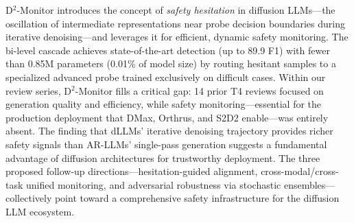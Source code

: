 \documentclass[11pt,a4paper]{article}
\begin{document}
D$^2$-Monitor introduces the concept of \emph{safety hesitation} in diffusion LLMs---the oscillation of intermediate representations near probe decision boundaries during iterative denoising---and leverages it for efficient, dynamic safety monitoring. The bi-level cascade achieves state-of-the-art detection (up to 89.9 F1) with fewer than 0.85M parameters (0.01\% of model size) by routing hesitant samples to a specialized advanced probe trained exclusively on difficult cases. Within our review series, D$^2$-Monitor fills a critical gap: 14 prior T4 reviews focused on generation quality and efficiency, while safety monitoring---essential for the production deployment that DMax, Orthrus, and S2D2 enable---was entirely absent. The finding that dLLMs' iterative denoising trajectory provides richer safety signals than AR-LLMs' single-pass generation suggests a fundamental advantage of diffusion architectures for trustworthy deployment. The three proposed follow-up directions---hesitation-guided alignment, cross-modal/cross-task unified monitoring, and adversarial robustness via stochastic ensembles---collectively point toward a comprehensive safety infrastructure for the diffusion LLM ecosystem.
\end{document}
